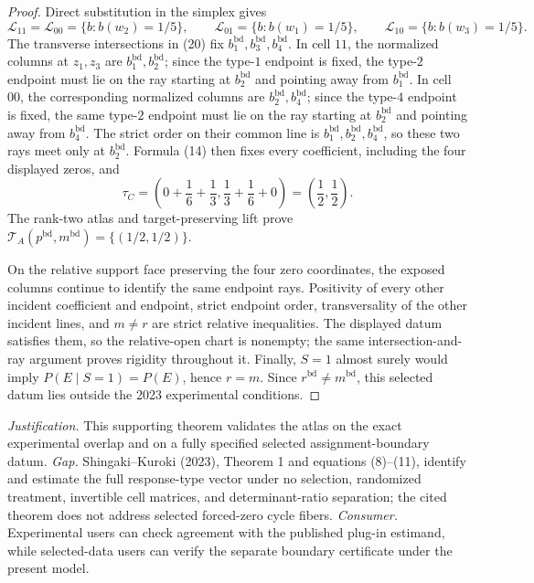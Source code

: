 \documentclass{article}
\begin{document}
\begin{proof}
Direct substitution in the simplex gives
\[
 \mathcal L_{11}=\mathcal L_{00}
 =\{b:b(w_2)=1/5\},\qquad
 \mathcal L_{01}=\{b:b(w_1)=1/5\},\qquad
 \mathcal L_{10}=\{b:b(w_3)=1/5\}.                       \tag{20}
\]
The transverse intersections in (20) fix \(b_1^{\mathrm{bd}},b_3^{\mathrm{bd}},b_4^{\mathrm{bd}}\).  In cell \(11\), the normalized columns at \(z_1,z_3\) are \(b_1^{\mathrm{bd}},b_2^{\mathrm{bd}}\); since the type-\(1\) endpoint is fixed, the type-\(2\) endpoint must lie on the ray starting at \(b_2^{\mathrm{bd}}\) and pointing away from \(b_1^{\mathrm{bd}}\).  In cell \(00\), the corresponding normalized columns are \(b_2^{\mathrm{bd}},b_4^{\mathrm{bd}}\); since the type-\(4\) endpoint is fixed, the same type-\(2\) endpoint must lie on the ray starting at \(b_2^{\mathrm{bd}}\) and pointing away from \(b_4^{\mathrm{bd}}\).  The strict order on their common line is \(b_1^{\mathrm{bd}},b_2^{\mathrm{bd}},b_4^{\mathrm{bd}}\), so these two rays meet only at \(b_2^{\mathrm{bd}}\).  Formula (14) then fixes every coefficient, including the four displayed zeros, and
\[
 \tau_C
 =\left(0+\frac16+\frac13,
          \frac13+\frac16+0\right)
 =\left(\frac12,\frac12\right).                          \tag{21}
\]
The rank-two atlas and target-preserving lift prove
\(\mathcal T_A(p^{\mathrm{bd}},m^{\mathrm{bd}})=\{(1/2,1/2)\}\).

On the relative support face preserving the four zero coordinates, the exposed columns continue to identify the same endpoint rays.  Positivity of every other incident coefficient and endpoint, strict endpoint order, transversality of the other incident lines, and \(m\ne r\) are strict relative inequalities.  The displayed datum satisfies them, so the relative-open chart is nonempty; the same intersection-and-ray argument proves rigidity throughout it.  Finally, \(S=1\) almost surely would imply \(P(E\mid S=1)=P(E)\), hence \(r=m\).  Since \(r^{\mathrm{bd}}\ne m^{\mathrm{bd}}\), this selected datum lies outside the 2023 experimental conditions.
\end{proof}
\par\smallskip\noindent \textit{Justification.} This supporting theorem validates the atlas on the exact experimental overlap and on a fully specified selected assignment-boundary datum. \textit{Gap.} Shingaki--Kuroki (2023), Theorem 1 and equations (8)--(11), identify and estimate the full response-type vector under no selection, randomized treatment, invertible cell matrices, and determinant-ratio separation; the cited theorem does not address selected forced-zero cycle fibers. \textit{Consumer.} Experimental users can check agreement with the published plug-in estimand, while selected-data users can verify the separate boundary certificate under the present model.
\end{document}
